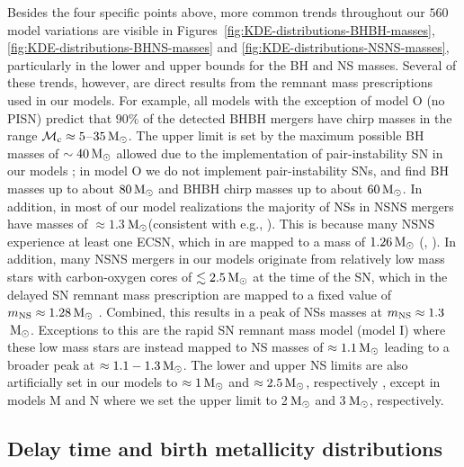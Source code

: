 \documentclass[fleqn,usenatbib]{mnras}
\newcommand\COMPAS{{\sc{COMPAS }}}
\newcommand{\Msun}{\ensuremath{\,\rm{M}_{\odot}}\xspace}
\newcommand{\mnsf}{\ensuremath{m_{\rm{NS}}}\xspace}
\newcommand{\mchirpf}{\ensuremath{{\mathcal{M}}_{\rm{c}}}\xspace}
\newcommand{\Nmodels}{\ensuremath{560}\xspace}
\begin{document}
Besides the four specific points above, more common trends throughout our \Nmodels model variations are visible in Figures~\ref{fig:KDE-distributions-BHBH-masses}, \ref{fig:KDE-distributions-BHNS-masses} and \ref{fig:KDE-distributions-NSNS-masses}, particularly in the lower and upper bounds for the \ac{BH} and \ac{NS} masses. Several of these trends, however, are direct results from the remnant mass prescriptions used in our models. For example, all models with the exception of model O (no PISN) predict that $90\%$ of the detected \ac{BHBH} mergers have chirp masses in the range $\mchirpf \approx 5$--$35\Msun$. The upper limit is set by the maximum possible BH masses of $\sim 40\Msun$ allowed due to the implementation of pair-instability \ac{SN} in our models \citep[e.g.,][]{Marchant:2019,Stevenson:2019}; in model O we do not implement pair-instability \acp{SN}, and find \ac{BH} masses up to about $80\Msun$ and \ac{BHBH} chirp masses up to about $60\Msun$. 
In addition, in most of our model realizations the majority of \acp{NS} in \ac{NSNS} mergers have masses of $\approx 1.3$\Msun (consistent with e.g., \citealt{2017ApJ...846..170T,VignaGomez:2018}). This is because many \ac{NSNS} experience at least one \ac{ECSN}, which in \COMPAS are mapped to a mass of $1.26\Msun$ (\citealt{1996ApJ...457..834T}, \citealt{COMPAS:2021methodsPaper}).  In addition, many \ac{NSNS} mergers in our models originate from relatively low mass stars with carbon-oxygen cores of $\lesssim 2.5\Msun$ at the time of the \ac{SN}, which in the delayed \ac{SN} remnant mass prescription are mapped to a fixed value of $\mnsf \approx 1.28\Msun$  \citep{2012ApJ...749...91F}. Combined, this results in a peak of \acp{NS} masses at $\mnsf\approx 1.3$\Msun. Exceptions to this are the rapid \ac{SN} remnant mass model (model I) where these low mass stars are instead mapped to \ac{NS} masses of $\approx 1.1\Msun$ leading to a broader peak at $\approx 1.1-1.3\Msun$. The lower and upper \ac{NS} limits are also artificially set in our models to $\approx 1\Msun$ and $\approx 2.5\Msun$, respectively \citep[cf.,][]{2012ApJ...749...91F}, except in models M and N where we set the upper limit to 2\Msun and 3\Msun, respectively. 








\subsection{Delay time and birth metallicity distributions}
\label{sec:results-distributions-delay-times}
\end{document}
